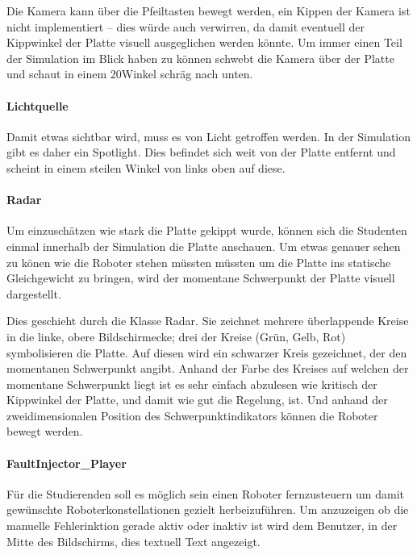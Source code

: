 Die Kamera kann {\"{u}}ber die Pfeiltasten bewegt werden, ein Kippen der Kamera ist nicht implementiert --
dies w{\"{u}}rde auch verwirren, da damit eventuell der Kippwinkel der Platte visuell ausgeglichen
werden k{\"{o}}nnte. Um immer einen Teil der Simulation im Blick haben zu k{\"{o}}nnen schwebt die Kamera
{\"{u}}ber der Platte und schaut in einem 20\textdegree Winkel schr{\"{a}}g nach unten.

\paragraph{Lichtquelle} Damit etwas sichtbar wird, muss es von Licht getroffen werden. In der Simulation
gibt es daher ein Spotlight. Dies befindet sich weit von der Platte entfernt und scheint in einem steilen Winkel
von links oben auf diese.

\paragraph{Radar} Um einzusch{\"{a}}tzen wie stark die Platte gekippt wurde, k{\"{o}}nnen sich die Studenten einmal
innerhalb der Simulation die Platte anschauen. Um etwas genauer sehen zu k{\"{o}}nen wie die Roboter stehen m{\"{u}}ssten
m{\"{u}}ssten um die Platte ins statische Gleichgewicht zu bringen, wird der momentane Schwerpunkt der Platte visuell
dargestellt.

Dies geschieht durch die Klasse Radar. Sie zeichnet mehrere {\"{u}}berlappende Kreise in die linke, obere Bildschirmecke;
drei der Kreise (Gr{\"{u}}n, Gelb, Rot) symbolisieren die Platte. Auf diesen wird ein schwarzer Kreis gezeichnet, der den
momentanen Schwerpunkt angibt. Anhand der Farbe des Kreises auf welchen der momentane Schwerpunkt liegt ist es sehr einfach
abzulesen wie kritisch der Kippwinkel der Platte, und damit wie gut die Regelung, ist. Und anhand der zweidimensionalen Position
des Schwerpunktindikators k{\"{o}}nnen die Roboter bewegt werden.

\paragraph{FaultInjector\_Player} F{\"{u}}r die Studierenden soll es m{\"{o}}glich sein einen Roboter fernzusteuern um damit
gew{\"{u}}nschte Roboterkonstellationen gezielt herbeizuf{\"{u}}hren. Um anzuzeigen ob die manuelle Fehlerinktion gerade aktiv
oder inaktiv ist wird dem Benutzer, in der Mitte des Bildschirms, dies textuell Text angezeigt.

